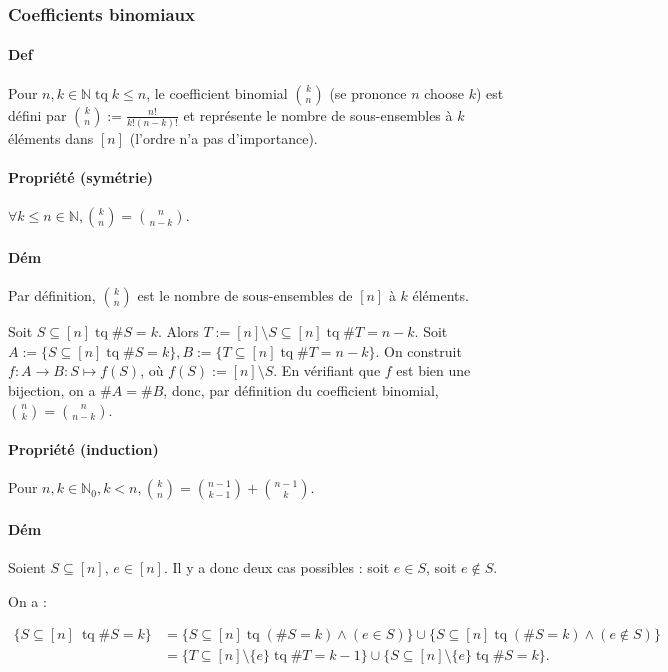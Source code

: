\documentclass{article}
\DeclareMathOperator{\tq}{\text{ tq }}
\begin{document}
			\subsubsection{Coefficients binomiaux}

			\paragraph{Def} Pour $n, k \in \mathbb N \tq k \leq n$, le coefficient binomial $\binom kn$ (se prononce $n$ choose $k$) est défini par
			$\binom kn := \frac {n!}{k!(n-k)!}$ et représente le nombre de sous-ensembles à $k$ éléments dans $[n]$ (l'ordre n'a pas d'importance).

			\paragraph{Propriété (symétrie)} $\forall k \leq n \in \mathbb N, \binom kn = \binom n{n-k}$.

			\paragraph{Dém} Par définition, $\binom kn$ est le nombre de sous-ensembles de $[n]$ à $k$ éléments.

			Soit $S \subseteq [n] \tq \#S = k$. Alors $T := [n] \setminus S \subseteq [n] \tq \#T = n-k$. Soit $A := \{S \subseteq [n] \tq \#S = k\},
			B := \{T \subseteq [n] \tq \#T = n-k\}$. On construit $f : A \to B : S \mapsto f(S)$, où $f(S) := [n] \setminus S$. En vérifiant que $f$ est bien une bijection,
			on a $\#A = \#B$, donc, par définition du coefficient binomial, $\binom nk = \binom n{n-k}$.

			\paragraph{Propriété (induction)} Pour $n, k \in \mathbb N_0, k < n, \binom kn = \binom {n-1}{k-1} + \binom{n-1}{k}$.

			\paragraph{Dém} Soient $S \subseteq [n]$, $e \in [n]$. Il y a donc deux cas possibles : soit $e \in S$, soit $e \not \in S$.

			On a :

			\[\begin{aligned}
				\{S \subseteq [n]\ \tq \#S = k\} &= \{S \subseteq [n] \tq (\#S = k) \land (e \in S)\} \cup \{S \subseteq [n] \tq (\#S = k) \land (e \not \in S)\} \\
												 &= \{T \subseteq [n] \setminus \{e\} \tq \#T = k-1\} \cup \{S \subseteq [n] \setminus \{e\} \tq \#S = k\}.
			\end{aligned}\]
\end{document}

